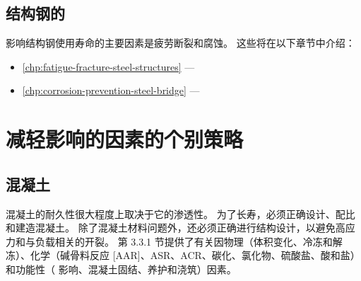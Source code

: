 \subsection{结构钢的}
影响结构钢使用寿命的主要因素是疲劳断裂和腐蚀。 这些将在以下章节中介绍：

\begin{itemize}
  \item \cref{chp:fatigue-fracture-steel-structures} — 
  \item \cref{chp:corrosion-prevention-steel-bridge} — 
\end{itemize}

\section{减轻影响的因素的个别策略}
\label{sec:individual-strategies}
\subsection{混凝土}
混凝土的耐久性很大程度上取决于它的渗透性。 为了长寿，必须正确设计、配比和建造混凝土。 除了混凝土材料问题外，还必须正确进行结构设计，以避免高应力和与负载相关的开裂。 第 3.3.1 节提供了有关因物理（体积变化、冷冻和解冻）、化学（碱骨料反应 [AAR]、ASR、ACR、碳化、氯化物、硫酸盐、酸和盐）和功能性（ 影响、混凝土固结、养护和浇筑）因素。

